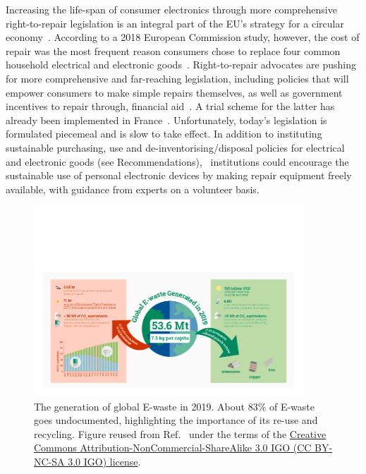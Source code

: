 \documentclass[../SustainableHEP.tex]{subfiles}
\begin{document}
Increasing the life-span of consumer electronics through more comprehensive right-to-repair 
legislation is an integral part of the EU's strategy for a circular economy~\cite{EUNews,EUR2RSummary}.  According to a 2018 European Commission study, however, the cost of repair was the most frequent reason consumers chose to replace four common household electrical and electronic goods~\cite{ECConsumerStudy}. 
Right-to-repair advocates are pushing for more comprehensive and far-reaching legislation, including policies that will empower consumers to make simple repairs themselves, as well as government incentives to repair through, \eg financial aid~\cite{R2RPolicy}. A trial scheme for the latter has already been implemented in France~\cite{FrenchRepairAid}.  Unfortunately, today's legislation is formulated piecemeal and is slow to take effect.  In addition to instituting sustainable purchasing, use and de-inventorising/disposal policies for electrical and electronic goods (see Recommendations), \ACR\ institutions could encourage the sustainable use of personal electronic devices by making repair equipment freely available, with guidance from experts on a volunteer basis.

\begin{figure}
    \centering
    \includegraphics[width=0.9\textwidth]{Sections/Figs/Waste/EWaste-1.png}
    \caption[Global E-waste generated in 2019]{The generation of global E-waste in 2019. About 83\% of E-waste goes undocumented, highlighting the importance of its re-use and recycling. Figure reused from Ref.~\cite{EWaste} under the terms of the \href{https://creativecommons.org/licenses/by-nc-sa/3.0/igo/}{Creative Commons Attribution-NonCommercial-ShareAlike 3.0 IGO (CC BY-NC-SA 3.0 IGO) license}.\label{fig:ewaste}}
\end{figure}
\end{document}
